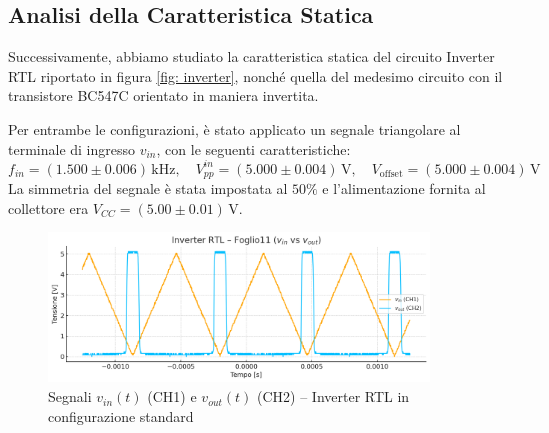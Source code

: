 \documentclass[a4paper,12pt]{article}
\begin{document}


\subsection{Analisi della Caratteristica Statica}

Successivamente, abbiamo studiato la caratteristica statica del circuito Inverter RTL riportato in figura \ref{fig: inverter}, nonché quella del medesimo circuito con il transistore BC547C orientato in maniera invertita.

Per entrambe le configurazioni, è stato applicato un segnale triangolare al terminale di ingresso \(v_{in}\), con le seguenti caratteristiche:
\[
f_{in} = (1.500 \pm 0.006)\,\mathrm{kHz}, \quad V_{pp}^{in} = (5.000 \pm 0.004)\,\mathrm{V}, \quad V_{\text{offset}} = (5.000 \pm 0.004)\,\mathrm{V}
\]
La simmetria del segnale è stata impostata al \(50\%\) e l’alimentazione fornita al collettore era \(V_{CC} = (5.00 \pm 0.01)\,\mathrm{V}\).

\begin{figure}[H]
  \centering
  \includegraphics[width=0.9\textwidth]{triangolare2.png}
  \caption{Segnali \(v_{in}(t)\) (CH1) e \(v_{out}(t)\) (CH2) – Inverter RTL in configurazione standard}
  \label{fig: inverter-triangolare}
\end{figure}
\end{document}
